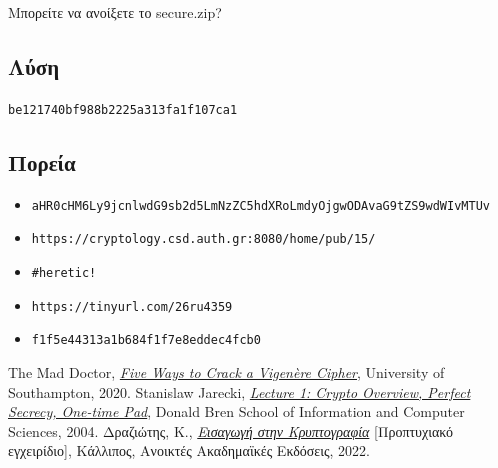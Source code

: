 \documentclass[oneside]{article}
\let\t\texttt
\begin{document}
Μπορείτε να ανοίξετε το secure.zip?

\subsection{Λύση}

\begin{center}
    \t{be121740bf988b2225a313fa1f107ca1}
\end{center}

\subsection{Πορεία}

\begin{itemize}
    \item \t{aHR0cHM6Ly9jcnlwdG9sb2d5LmNzZC5hdXRoLmdyOjgwODAvaG9tZS9wdWIvMTUv}
    \item \t{https://cryptology.csd.auth.gr:8080/home/pub/15/}
    \item \t{\#heretic!}
    \item \t{https://tinyurl.com/26ru4359}
    \item \t{f1f5e44313a1b684f1f7e8eddec4fcb0}
\end{itemize}

\begin{thebibliography}{3} 
     The Mad Doctor, \emph{\href{https://www.cipherchallenge.org/wp-content/uploads/2020/12/Five-ways-to-crack-a-Vigenere-cipher.pdf}{Five Ways to Crack a Vigenère Cipher}}, University of Southampton, 2020.
     Stanislaw Jarecki, \emph{\href{https://www.ics.uci.edu/\%7Estasio/fall04/lect1.pdf}{Lecture 1: Crypto Overview, Perfect Secrecy, One-time Pad}}, Donald Bren School of Information and Computer Sciences, 2004.
     Δραζιώτης, Κ., \emph{\href{https://repository.kallipos.gr/handle/11419/8016?&locale=el}{Εισαγωγή στην Κρυπτογραφία}} [Προπτυχιακό εγχειρίδιο], Κάλλιπος, Ανοικτές Ακαδημαϊκές Εκδόσεις, 2022.
\end{thebibliography}
\end{document}
